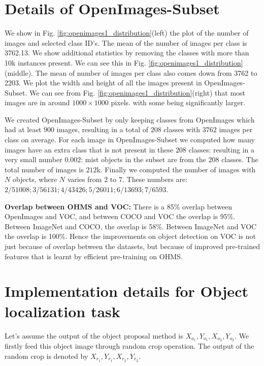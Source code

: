 \appendix

\section{Details of OpenImages-Subset}
\label{sec:details_openimages}
We show in Fig. \ref{fig:openimages1_distribution}(left) the plot of the number of images and selected class ID's. The mean of the number of images per class is 3762.13. We show additional statistics by removing the classes with more than 10k instances present. We can see this in Fig. \ref{fig:openimages1_distribution}(middle). The mean of number of images per class also comes down from 3762 to 2203. We plot the width and height of all the images present in OpenImages-Subset. We can see from Fig. \ref{fig:openimages1_distribution}(right) that most images are in around $1000 \times 1000$ pixels. with some being significantly larger.

We created OpenImages-Subset by only keeping classes from OpenImages which had at least $900$ images, resulting in a total of $208$ classes with $3762$ images per class on average. For each image in OpenImages-Subset we computed how many images have an extra class that is not present in these $208$ classes: resulting in a very small number $0.002$: mist objects in the subset are from the $208$ classes. The total number of images is $212$k. Finally we computed the number of images with $N$ objects, where $N$ varies from $2$ to $7$. These numbers are: $2/51008; 3/56131; 4/43426; 5/26011; 6/13693; 7/6593$.


{\textbf{Overlap between OHMS and VOC:}
There is a 85\% overlap between OpenImages and VOC, and between COCO and VOC the overlap is 95\%. Between ImageNet and COCO, the overlap is 58\%. Between ImageNet and VOC the overlap is 100\%. Hence the improvements on object detection on VOC is not just because of overlap between the datasets, but because of improved pre-trained features that is learnt by efficient pre-training on OHMS.}
\section{Implementation details for Object localization task}
Let's assume the output of the object proposal method is $X_{o_1}, Y_{o_1}, X_{o_2}, Y_{o_2}$. We firstly feed this object image through random crop operation. The output of the random crop is denoted by  $X_{r_1}, Y_{r_1}, X_{r_2}, Y_{r_2}$. 

